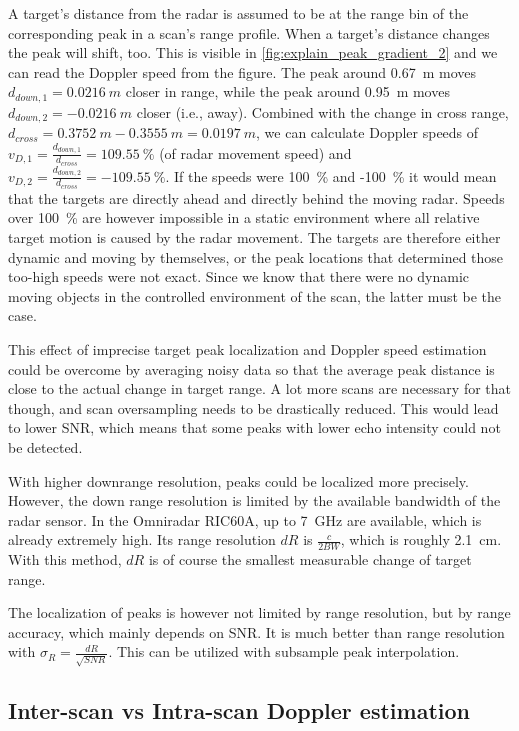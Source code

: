 A target's distance from the radar is assumed to be at the range bin of
the corresponding peak in a scan's range profile. When a target's
distance changes the peak will shift, too. This is visible in \cref{fig:explain_peak_gradient_2} and we can read the Doppler speed from the figure. The peak around \SI{0.67}{m} moves \(d_{down,1} = \SI{0.0216}{m}\) closer in range, while the peak
around \SI{0.95}{m} moves \(d_{down,2} = -\SI{0.0216}{m}\) closer (i.e., away).
Combined with the change in cross range,
\(d_{cross} = \SI{0.3752}{m} - \SI{0.3555}{m} = \SI{0.0197}{m}\), we can calculate Doppler
speeds of \(v_{D,1} = \frac{d_{down,1}}{d_{cross}} = \SI{109.55}{\%}\) (of
radar movement speed) and
\(v_{D,2} = \frac{d_{down,2}}{d_{cross}} = -\SI{109.55}{\%}\). If the speeds
were \SI{100}{\%} and -\SI{100}{\%} it would mean that the targets are directly
ahead and directly behind the moving radar. Speeds over \SI{100}{\%} are
however impossible in a static environment where all relative target
motion is caused by the radar movement. The targets are therefore either
dynamic and moving by themselves, or the peak locations that determined
those too-high speeds were not exact. Since we know that there were no
dynamic moving objects in the controlled environment of the scan, the
latter must be the case.

This effect of imprecise target peak localization and Doppler speed
estimation could be overcome by averaging noisy data so that the average
peak distance is close to the actual change in target range. A lot more
scans are necessary for that though, and scan oversampling needs to be
drastically reduced. This would lead to lower SNR, which means that some
peaks with lower echo intensity could not be detected.

With higher downrange resolution, peaks could be localized more
precisely. However, the down range resolution is limited by the
available bandwidth of the radar sensor. In the Omniradar RIC60A, up to
\SI{7}{GHz} are available, which is already extremely high. Its range
resolution \(dR\) is \(\frac{c}{2 BW}\), which is roughly \SI{2.1}{cm}. With
this method, \(dR\) is of course the smallest measurable change of
target range.

The localization of peaks is however not limited by range resolution,
but by range accuracy, which mainly depends on SNR. It is much better
than range resolution with \(\sigma_R = \frac{dR}{\sqrt{SNR}}\). This
can be utilized with subsample peak interpolation.

\subsection{Inter-scan vs Intra-scan Doppler estimation}\label{inter-scan-vs-intra-scan-doppler-estimation}

